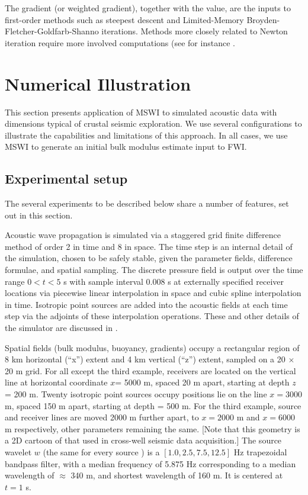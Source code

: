 The gradient (or weighted gradient), together with the value, are the
inputs to first-order methods such as steepest descent and
Limited-Memory Broyden-Fletcher-Goldfarb-Shanno
iterations. Methods more closely related to Newton iteration require
more involved computations (see for instance \cite{Kaufman:75}. 

\section{Numerical Illustration}


This section presents application of MSWI to simulated acoustic data with dimensions
typical of crustal seismic exploration. We use several configurations
to illustrate the capabilities and limitations of this approach. In
all cases, we use MSWI to generate an initial bulk modulus estimate
input to FWI.

\subsection{Experimental setup}

The several experiments to be described below share a number of
features, set out in this section. 

Acoustic wave
propagation is simulated via a staggered grid finite difference method
\cite[]{vir86,lev88,Cohen:01} of order 2 in time and 8 in space. The time
step is an internal detail of the simulation, chosen to be safely
stable, given the parameter fields, difference formulae, and 
spatial sampling. The discrete pressure field is
output over the time range $0 < t < 5$ s with sample interval $0.008$
s at externally specified receiver locations
via piecewise linear interpolation in space and cubic spline
interpolation in time. Isotropic point sources are added
into the acoustic fields at each time step via the adjoints of these
interpolation operations. These and other details of the simulator are
discussed in \cite{GeoPros:11}.

Spatial fields (bulk modulus, buoyancy, gradients) occupy a
rectangular region of 8 km horizontal (``x'') extent and 4 km vertical
(``z'') extent, sampled on a 20 $\times$ 20 m grid. For all except the
third example, receivers are located on the vertical line at
horizontal coordinate $x$= 5000 m, spaced 20 m apart, starting at
depth $z$ = 200 m. Twenty isotropic point sources occupy positions lie
on the line $x=3000$ m, spaced 150 m apart, starting at depth = 500
m. For the third example, source and receiver lines are moved 2000 m
further apart, to $x=2000$ m and $x=6000$ m respectively, other
parameters remaining the same. [Note that this geometry is a 2D
cartoon of that used in cross-well seismic data acquisition.] The
source wavelet $w$ (the same for every source ) is a
$[1.0, 2.5, 7.5, 12.5]$ Hz trapezoidal bandpass filter, with a median
frequency of 5.875 Hz corresponding to a median wavelength of
$\approx$ 340 m, and shortest wavelength of 160 m. It is centered at
$t=1$ s.

